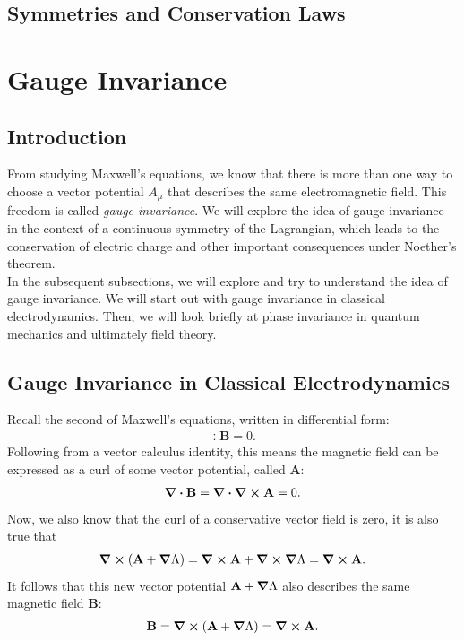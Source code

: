 \documentclass[a4paper,11pt]{article}
\numberwithin{equation}{section}
\theoremstyle{definition}
\begin{document}
\subsection{Symmetries and Conservation Laws}


\newpage
\section{Gauge Invariance}
\subsection{Introduction}
From studying Maxwell's equations, we know that there is more than one way to choose a vector potential $A_\mu$ that describes the same electromagnetic field. This freedom is called \textit{gauge invariance}. We will explore the idea of gauge invariance  in the context of a continuous symmetry of the Lagrangian, which leads to the conservation of electric charge and other important consequences under Noether's theorem.\\

In the subsequent subsections, we will explore and try to understand the idea of gauge invariance. We will start out with gauge invariance in classical electrodynamics. Then, we will look briefly at phase invariance in quantum mechanics and ultimately field theory.  
\subsection{Gauge Invariance in Classical Electrodynamics}
Recall the second of Maxwell's equations, written in differential form:
\begin{align*}
\div{\mathbf{B}} = 0.
\end{align*}
Following from a vector calculus identity, this means the magnetic field can be expressed as a curl of some vector potential, called $\mathbf{A}$:
\begin{align*}
\div{\mathbf{B}} = \div{\curl\mathbf{A}} = 0.
\end{align*}
Now, we also know that the curl of a conservative vector field is zero, it is also true that
\begin{align*}
\curl{(\mathbf{A} + \grad{\Lambda})}= \curl{\mathbf{A}} + \curl{\grad{\Lambda}} = \curl{\mathbf{A}}.
\end{align*}
It follows that this new vector potential $\mathbf{A} + \grad{\Lambda}$ also describes the same magnetic field $\mathbf{B}$:
\begin{align*}
\mathbf{B} = \curl{(\mathbf{A} + \grad{\Lambda})} = \curl{\mathbf{A}}.
\end{align*}
\end{document}
